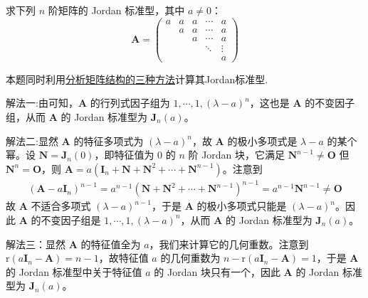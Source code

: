 \documentclass[../../main.tex]{subfiles}
\begin{document}
\begin{example}\label{example:元素全一样的上三角矩阵的Jordan标准型}
求下列 \(n\) 阶矩阵的 Jordan 标准型，其中 \(a \neq 0\)：
\[
\boldsymbol{A} = 
\begin{pmatrix}
a & a & a & \cdots & a \\
& a & a & \cdots & a \\
& & a & \cdots & a \\
& & & \ddots & \vdots \\
& & & & a
\end{pmatrix}
\]
\end{example}
\begin{remark}
本题同时利用\hyperlink{分析矩阵结构的方法}{分析矩阵结构的三种方法}计算其Jordan标准型.
\end{remark}
\begin{solution}
{\color{blue}解法一:}由可知，\(\boldsymbol{A}\) 的行列式因子组为 \(1, \cdots, 1, (\lambda - a)^n\)，这也是 \(\boldsymbol{A}\) 的不变因子组，从而 \(\boldsymbol{A}\) 的 Jordan 标准型为 \(\boldsymbol{J}_n(a)\)。

{\color{blue}解法二:}显然 \(\boldsymbol{A}\) 的特征多项式为 \((\lambda - a)^n\)，故 \(\boldsymbol{A}\) 的极小多项式是 \(\lambda - a\) 的某个幂。设 \(\boldsymbol{N} = \boldsymbol{J}_n(0)\)，即特征值为 \(0\) 的 \(n\) 阶 Jordan 块，它满足 \(\boldsymbol{N}^{n - 1} \neq \boldsymbol{O}\) 但 \(\boldsymbol{N}^n = \boldsymbol{O}\)，则 \(\boldsymbol{A} = a(\boldsymbol{I}_n + \boldsymbol{N} + \boldsymbol{N}^2 + \cdots + \boldsymbol{N}^{n - 1})\)。注意到
\begin{align*}
(\boldsymbol{A} - a\boldsymbol{I}_n)^{n - 1} = a^{n - 1}(\boldsymbol{N} + \boldsymbol{N}^2 + \cdots + \boldsymbol{N}^{n - 1})^{n - 1} = a^{n - 1}\boldsymbol{N}^{n - 1} \neq \boldsymbol{O}
\end{align*}
故 \(\boldsymbol{A}\) 不适合多项式 \((\lambda - a)^{n - 1}\)，于是 \(\boldsymbol{A}\) 的极小多项式只能是 \((\lambda - a)^n\)。因此 \(\boldsymbol{A}\) 的不变因子组是 \(1, \cdots, 1, (\lambda - a)^n\)，从而 \(\boldsymbol{A}\) 的 Jordan 标准型为 \(\boldsymbol{J}_n(a)\)。

{\color{blue}解法三：}显然 \(\boldsymbol{A}\) 的特征值全为 \(a\)，我们来计算它的几何重数。注意到 \(\mathrm{r}(a\boldsymbol{I}_n - \boldsymbol{A}) = n - 1\)，故特征值 \(a\) 的几何重数为 \(n - \mathrm{r}(a\boldsymbol{I}_n - \boldsymbol{A}) = 1\)，于是 \(\boldsymbol{A}\) 的 Jordan 标准型中关于特征值 \(a\) 的 Jordan 块只有一个，因此 \(\boldsymbol{A}\) 的 Jordan 标准型为 \(\boldsymbol{J}_n(a)\)。
\end{solution}
\end{document}

